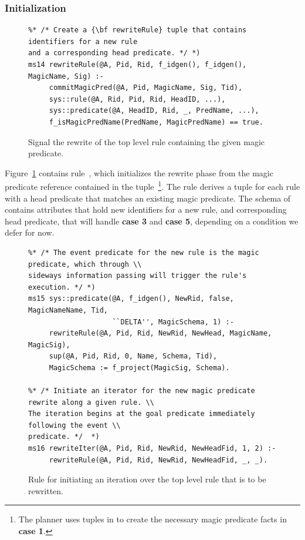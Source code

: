 \subsubsection{Initialization}

\begin{figure}[!t]
\ssp
\centering
\begin{lstlisting}
%* /* Create a {\bf rewriteRule} tuple that contains identifiers for a new rule
and a corresponding head predicate. */ *)
ms14 rewriteRule(@A, Pid, Rid, f_idgen(), f_idgen(), MagicName, Sig) :-
     commitMagicPred(@A, Pid, MagicName, Sig, Tid),
     sys::rule(@A, Rid, Pid, Rid, HeadID, ...),
     sys::predicate(@A, HeadID, Rid, _, PredName, ...),
     f_isMagicPredName(PredName, MagicPredName) == true.
\end{lstlisting}
\caption{\label{ch:magic:fig:rewrite1} Signal the rewrite of the top level rule 
containing the given magic predicate.}
\end{figure}

Figure~\ref{ch:magic:fig:rewrite1} contains rule~, which initializes
the rewrite phase from the magic predicate reference contained in the
 tuple~\footnote{The planner uses tuples in
 to create the necessary magic predicate facts in {\bf case
1}.}.  The rule derives a  tuple for each rule with a head
predicate that matches an existing magic predicate.  The schema of
 contains attributes that hold new identifiers for a new
rule, and corresponding head predicate, that will handle {\bf case 3} and
{\bf case 5}, depending on a condition we defer for now.

\begin{figure}[!t]
\ssp
\centering
\begin{lstlisting}
%* /* The event predicate for the new rule is the magic predicate, which through \\
sideways information passing will trigger the rule's execution. */ *)
ms15 sys::predicate(@A, f_idgen(), NewRid, false, MagicNameName, Tid, 
                    ``DELTA'', MagicSchema, 1) :-
     rewriteRule(@A, Pid, Rid, NewRid, NewHead, MagicName, MagicSig),
     sup(@A, Pid, Rid, 0, Name, Schema, Tid),
     MagicSchema := f_project(MagicSig, Schema).

%* /* Initiate an iterator for the new magic predicate rewrite along a given rule. \\
The iteration begins at the goal predicate immediately following the event \\
predicate. */  *)
ms16 rewriteIter(@A, Pid, Rid, NewRid, NewHeadFid, 1, 2) :-
     rewriteRule(@A, Pid, Rid, NewRid, NewHeadFid, _, _).

\end{lstlisting}
\caption{\label{ch:magic:fig:rewrite2} Rule for initiating an iteration over the
top level rule that is to be rewritten. }
\end{figure}

